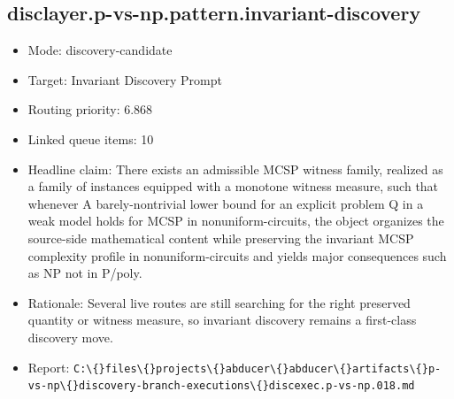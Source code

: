 \documentclass[11pt]{article}
\begin{document}
\subsection*{disclayer.p-vs-np.pattern.invariant-discovery}
\begin{itemize}
\item Mode: discovery-candidate
\item Target: Invariant Discovery Prompt
\item Routing priority: 6.868
\item Linked queue items: 10
\item Headline claim: There exists an admissible MCSP witness family, realized as a family of instances equipped with a monotone witness measure, such that whenever A barely-nontrivial lower bound for an explicit problem Q in a weak model holds for MCSP in nonuniform-circuits, the object organizes the source-side mathematical content while preserving the invariant MCSP complexity profile in nonuniform-circuits and yields major consequences such as NP not in P/poly.
\item Rationale: Several live routes are still searching for the right preserved quantity or witness measure, so invariant discovery remains a first-class discovery move.
\item Report: \texttt{C:\textbackslash\{\}files\textbackslash\{\}projects\textbackslash\{\}abducer\textbackslash\{\}abducer\textbackslash\{\}artifacts\textbackslash\{\}p-vs-np\textbackslash\{\}discovery-branch-executions\textbackslash\{\}discexec.p-vs-np.018.md}
\end{itemize}
\end{document}
